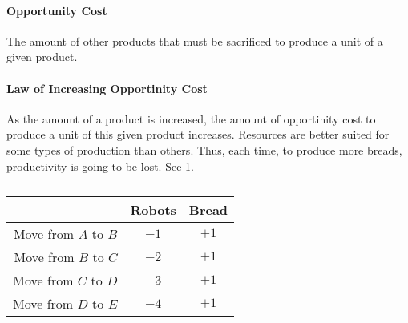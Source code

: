 \paragraph{Opportunity Cost} The amount of other products that must be sacrificed to produce a unit of a given product.

\paragraph{Law of Increasing Opportinity Cost} As the amount of a product is increased, the amount of opportinity cost to produce a unit of this given product increases. Resources are better suited for some types of production than others. Thus, each time, to produce more breads, productivity is going to be lost. See \cref{tab:breadvsrobots}.

\begin{table}[ht]
	\centering
	\begin{tabular}{rcc} \toprule
							 & Robots & Bread \\ \midrule
		Move from $A$ to $B$ & $-1$   & $+1$  \\
		Move from $B$ to $C$ & $-2$   & $+1$  \\ 
		Move from $C$ to $D$ & $-3$   & $+1$  \\ 
		Move from $D$ to $E$ & $-4$   & $+1$  \\ \bottomrule
	\end{tabular}
	\caption{}
	\label{tab:breadvsrobots}
\end{table}
